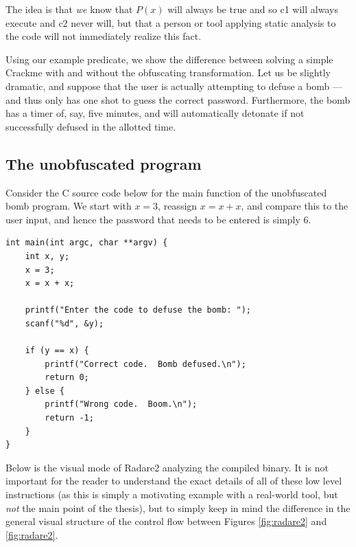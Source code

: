 \documentclass[12pt,notitlepage]{report}
\theoremstyle{plain}
\theoremstyle{definition}
\numberwithin{equation}{section}
\begin{document}
The idea is that \emph{we} know that $P(x)$ will always be true and so c1 will always execute and c2 never will, but that a person or tool applying static analysis to the code will not immediately realize this fact.


\par Using our example predicate, we show the difference between solving a simple Crackme with and without the obfuscating transformation.  Let us be slightly dramatic, and suppose that the user is actually attempting to defuse a bomb --- and thus only has one shot to guess the correct password.  Furthermore, the bomb has a timer of, say, five minutes, and will automatically detonate if not successfully defused in the allotted time.
\subsection{The unobfuscated program}

Consider the C source code below for the main function of the unobfuscated bomb program.  We start with $x=3$, reassign $x = x + x$, and compare this to the user input, and hence the password that needs to be entered is simply 6.

\begin{verbatim}
int main(int argc, char **argv) {
    int x, y;
    x = 3;
    x = x + x;

    printf("Enter the code to defuse the bomb: ");
    scanf("%d", &y);

    if (y == x) {
        printf("Correct code.  Bomb defused.\n");
        return 0;
    } else {
        printf("Wrong code.  Boom.\n");
        return -1;
    }
}
\end{verbatim}

Below is the visual mode of Radare2 analyzing the compiled binary.  It is not important for the reader to understand the exact details of all of these low level instructions (as this is simply a motivating example with a real-world tool, but \emph{not} the main point of the thesis), but to simply keep in mind the difference in the general visual structure of the control flow between Figures \ref{fig:radare2} and \ref{fig:radare2}.
\end{document}
